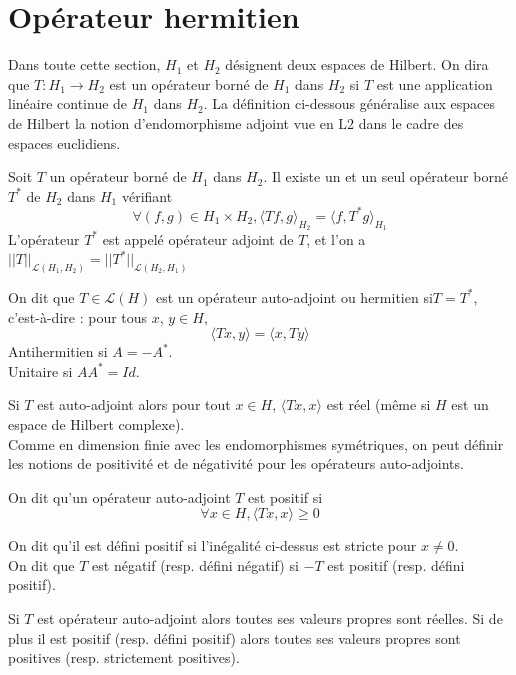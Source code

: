 \section{Opérateur hermitien}
Dans toute cette section, $H_1$ et $H_2$ désignent deux espaces de Hilbert. On dira que $T : H_1 \rightarrow
H_2$ est un opérateur borné de $H_1$ dans $H_2$ si $T$ est une application linéaire continue de $H_1$
dans $H_2$. La définition ci-dessous généralise aux espaces de Hilbert la notion d’endomorphisme adjoint vue en L2 dans le cadre des espaces euclidiens.
\begin{theorem}
Soit $T$ un opérateur borné de $H_1$ dans $H_2$. Il existe un et un seul opérateur borné $T^*$ de $H_2$ dans $H_1$ vérifiant
\begin{equation*}
\forall (f,g) \in H_1 \times H_2, \langle Tf,g \rangle_{H_2} = \langle f,T^* g \rangle_{H_1}
\end{equation*}
L’opérateur $T^*$ est appelé opérateur adjoint de $T$, et l'on a $||T||_{\mathcal{L}(H_1,H_2)} = ||T^*||_{\mathcal{L}(H_2,H_1)}$
\end{theorem}
\begin{definition}
	On dit que $T\in \mathcal{L}(H)$ est un opérateur auto-adjoint ou hermitien si$T=T^*$, c’est-à-dire : pour tous $x$, $y \in H$,
	\begin{equation*}
	\langle Tx, y \rangle = \langle x, Ty \rangle
	\end{equation*} Antihermitien si $A=-A^*$.\\
	Unitaire si $AA^*=Id$.
\end{definition}
Si $T$ est auto-adjoint alors pour tout $x \in H$, $\langle Tx , x\rangle$ est réel (même si $H$ est un espace de Hilbert complexe).\\
Comme en dimension finie avec les endomorphismes symétriques, on peut définir les notions de positivité et de négativité pour les opérateurs auto-adjoints.
\begin{definition}
On dit qu’un opérateur auto-adjoint $T$ est positif si\begin{equation*}
\forall x \in H, \langle Tx,x \rangle \geq 0
\end{equation*}
\end{definition}
On dit qu’il est défini positif si l’inégalité ci-dessus est stricte pour $x \neq 0$.\\
On dit que $T$ est négatif (resp. défini négatif) si $-T$ est positif (resp. défini positif).
\begin{proposition}
Si $T$ est opérateur auto-adjoint alors toutes ses valeurs propres sont réelles. Si de plus il est positif (resp. défini positif) alors toutes ses valeurs propres sont positives (resp. strictement positives).
\end{proposition}
